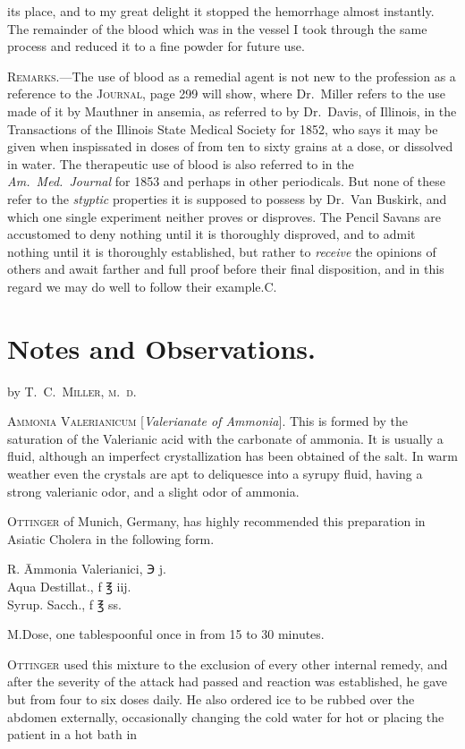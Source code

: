 its place, and to my great delight it stopped the hemorrhage almost
instantly. The remainder of the blood which was in the vessel I took
through the same process and reduced it to a fine powder for future use.

\textsc{Remarks}.---The use of blood as a remedial agent is not new to the
profession as a reference to the \textsc{Journal}, page 299 will show, where
Dr.\ Miller refers to the use made of it by Mauthner in ansemia, as
referred to by Dr.\ Davis, of Illinois, in the Transactions of the Illinois
State Medical Society for 1852, who says it may be given when inspissated
in doses of from ten to sixty grains at a dose, or dissolved in
water. The therapeutic use of blood is also referred to in the \emph{Am.\ Med.\ Journal}
for 1853 and perhaps in other periodicals. But none of
these refer to the \emph{styptic} properties it is supposed to possess by Dr.\ Van
Buskirk, and which one single experiment neither proves or disproves.
The Pencil Savans are accustomed to deny nothing until it is
thoroughly disproved, and to admit nothing until it is thoroughly established,
but rather to \emph{receive} the opinions of others and await farther
and full proof before their final disposition, and in this regard we may
do well to follow their example.\hfill{}C.

\section*{Notes and Observations.}

by \textsc{T.\ C.\ Miller, m.\ d.}

\textsc{Ammonia Valerianicum} [\emph{Valerianate of Ammonia}]. This is formed
by the saturation of the Valerianic acid with the carbonate of ammonia.
It is usually a fluid, although an imperfect crystallization has been obtained
of the salt. In warm weather even the crystals are apt to deliquesce
into a syrupy fluid, having a strong valerianic odor, and a
slight odor of ammonia.

\textsc{Ottinger} of Munich, Germany, has highly recommended this preparation
in Asiatic Cholera in the following form.

\begin{center}
\begin{tabbing}
  \textsf{℞}. \= Ammonia Valerianici, \textsf{℈} j. \\
    \> Aqua Destillat., f \textsf{℥} iij. \\
    \> Syrup. Sacch., f \textsf{℥} ss.
\end{tabbing}
\end{center}

M.\quad{}Dose, one tablespoonful once in from 15 to 30 minutes.

\textsc{Ottinger} used this mixture to the exclusion of every other internal
remedy, and after the severity of the attack had passed and reaction
was established, he gave but from four to six doses daily. He also
ordered ice to be rubbed over the abdomen externally, occasionally
changing the cold water for hot or placing the patient in a hot bath in\endinput
